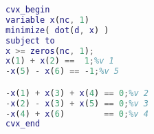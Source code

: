 \begin{lstlisting}[language=Matlab]
cvx_begin
variable x(nc, 1)
minimize( dot(d, x) )
subject to
x >= zeros(nc, 1);
x(1) + x(2) ==  1;%v 1
-x(5) - x(6) == -1;%v 5

-x(1) + x(3) + x(4) == 0;%v 2
-x(2) - x(3) + x(5) == 0;%v 3
-x(4) + x(6)        == 0;%v 4
cvx_end
\end{lstlisting}